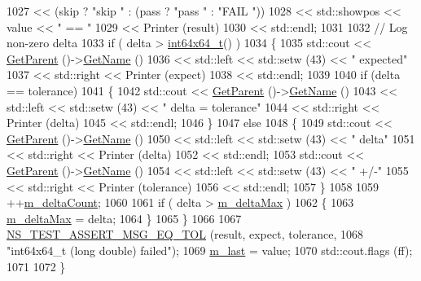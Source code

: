 \begin{DoxyCode}
1027             << (skip ? \textcolor{stringliteral}{"skip "} : (pass ? \textcolor{stringliteral}{"pass "} : \textcolor{stringliteral}{"FAIL "}))
1028             << std::showpos << value << \textcolor{stringliteral}{" == "} 
1029             << Printer (result)
1030             << std::endl;
1031   
1032   \textcolor{comment}{// Log non-zero delta}
1033   \textcolor{keywordflow}{if} ( delta > \hyperlink{classint64x64__t}{int64x64\_t}() )
1034     \{
1035       std::cout << \hyperlink{classns3_1_1TestCase_af41db0462b844c9f81838d0e61ecd563}{GetParent} ()->\hyperlink{classns3_1_1TestCase_a28f7bb59669c24dae1c290fc17fc9b62}{GetName} ()
1036                 << std::left  << std::setw (43) << \textcolor{stringliteral}{"         expected"}
1037                 << std::right << Printer (expect)
1038                 << std::endl;
1039 
1040       \textcolor{keywordflow}{if} (delta == tolerance)
1041         \{
1042           std::cout << \hyperlink{classns3_1_1TestCase_af41db0462b844c9f81838d0e61ecd563}{GetParent} ()->\hyperlink{classns3_1_1TestCase_a28f7bb59669c24dae1c290fc17fc9b62}{GetName} ()
1043                     << std::left  << std::setw (43) << \textcolor{stringliteral}{"         delta = tolerance"}
1044                     << std::right << Printer (delta)
1045                     << std::endl;
1046         \}
1047       \textcolor{keywordflow}{else}
1048         \{
1049           std::cout << \hyperlink{classns3_1_1TestCase_af41db0462b844c9f81838d0e61ecd563}{GetParent} ()->\hyperlink{classns3_1_1TestCase_a28f7bb59669c24dae1c290fc17fc9b62}{GetName} ()
1050                     << std::left  << std::setw (43) << \textcolor{stringliteral}{"         delta"}
1051                     << std::right << Printer (delta)
1052                     << std::endl;
1053           std::cout << \hyperlink{classns3_1_1TestCase_af41db0462b844c9f81838d0e61ecd563}{GetParent} ()->\hyperlink{classns3_1_1TestCase_a28f7bb59669c24dae1c290fc17fc9b62}{GetName} ()
1054                     << std::left  << std::setw (43) << \textcolor{stringliteral}{"         +/-"}
1055                     << std::right << Printer (tolerance)
1056                     << std::endl;
1057         \}
1058       
1059       ++\hyperlink{classns3_1_1int64x64_1_1test_1_1Int64x64DoubleTestCase_a7d56d2679c037d6a28351eb3b8b20d3e}{m\_deltaCount};
1060       
1061       \textcolor{keywordflow}{if} ( delta > \hyperlink{classns3_1_1int64x64_1_1test_1_1Int64x64DoubleTestCase_ab52535c9a92fd852a031900b3ba8b57d}{m\_deltaMax} )
1062         \{
1063           \hyperlink{classns3_1_1int64x64_1_1test_1_1Int64x64DoubleTestCase_ab52535c9a92fd852a031900b3ba8b57d}{m\_deltaMax} = delta;
1064         \}
1065     \}
1066   
1067   \hyperlink{group__testing_ga9e7861b56b4e70db3b56044cb7a28e41}{NS\_TEST\_ASSERT\_MSG\_EQ\_TOL} (result, expect, tolerance,
1068                              \textcolor{stringliteral}{"int64x64\_t (long double) failed"});
1069   \hyperlink{classns3_1_1int64x64_1_1test_1_1Int64x64DoubleTestCase_a8ac90dc336e01dc3de2475f47ec10060}{m\_last} = value;
1070   std::cout.flags (ff);
1071 
1072 \}
\end{DoxyCode}


